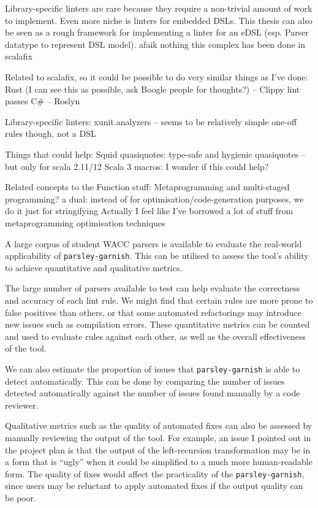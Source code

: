 \documentclass[../../main.tex]{subfiles}
\begin{document}
Library-specific linters are rare because they require a non-trivial amount of work to implement.
Even more niche is linters for embedded DSLs.
This thesis can also be seen as a rough framework for implementing a linter for an eDSL (esp. Parser datatype to represent DSL model).
afaik nothing this complex has been done in scalafix

Related to scalafix, so it could be possible to do very similar things as I've done:
Rust (I can see this as possible, ask Boogle people for thoughts?) -- Clippy lint passes %
C\# -- Roslyn

Library-specific linters:
xunit.analyzers -- seems to be relatively simple one-off rules though, not a DSL

Things that could help:
Squid quasiquotes: type-safe and hygienic quasiquotes -- but only for scala 2.11/12
Scala 3 macros: I wonder if this could help?

Related concepts to the Function stuff:
Metaprogramming and multi-staged programming? a dual: instead of for optimisation/code-generation purposes, we do it just for stringifying
Actually I feel like I've borrowed a lot of stuff from metaprogramming optimisation techniques


A large corpus of student WACC parsers is available to evaluate the real-world applicability of \texttt{parsley-garnish}.
This can be utilised to assess the tool's ability to achieve quantitative and qualitative metrics.

The large number of parsers available to test can help evaluate the correctness and accuracy of each lint rule.
We might find that certain rules are more prone to false positives than others, or that some automated refactorings may introduce new issues such as compilation errors.
These quantitative metrics can be counted and used to evaluate rules against each other, as well as the overall effectiveness of the tool.

We can also estimate the proportion of issues that \texttt{parsley-garnish} is able to detect automatically.
This can be done by comparing the number of issues detected automatically against the number of issues found manually by a code reviewer.

Qualitative metrics such as the quality of automated fixes can also be assessed by manually reviewing the output of the tool.
For example, an issue I pointed out in the project plan is that the output of the left-recursion transformation may be in a form that is ``ugly'' when it could be simplified to a much more human-readable form.
The quality of fixes would affect the practicality of the \texttt{parsley-garnish}, since users may be reluctant to apply automated fixes if the output quality can be poor.
\end{document}
